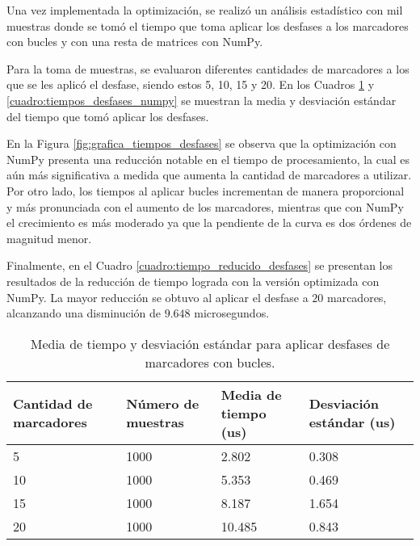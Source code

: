 Una vez implementada la optimización, se realizó un análisis estadístico con mil muestras donde se tomó el tiempo que toma aplicar los desfases a los marcadores con bucles y con una resta de matrices con NumPy.

Para la toma de muestras, se evaluaron diferentes cantidades de marcadores a los que se les aplicó el desfase, siendo estos 5, 10, 15 y 20. En los Cuadros \ref{cuadro:tiempos_desfases_for} y \ref{cuadro:tiempos_desfases_numpy} se muestran la media y desviación estándar del tiempo que tomó aplicar los desfases.

En la Figura \ref{fig:grafica_tiempos_desfases} se observa que la optimización con NumPy presenta una reducción notable en el tiempo de procesamiento, la cual es aún más significativa a medida que aumenta la cantidad de marcadores a utilizar. Por otro lado, los tiempos al aplicar bucles incrementan de manera proporcional y más pronunciada con el aumento de los marcadores, mientras que con NumPy el crecimiento es más moderado ya que la pendiente de la curva es dos órdenes de magnitud menor.

Finalmente, en el Cuadro \ref{cuadro:tiempo_reducido_desfases} se presentan los resultados de la reducción de tiempo lograda con la versión optimizada con NumPy. La mayor reducción se obtuvo al aplicar el desfase a $20$ marcadores, alcanzando una disminución de $9.648$ microsegundos.

\begin{table}[H]
	\centering
	\resizebox{\textwidth}{!} {
	\begin{tabular}{|l|l|l|l|}
		\hline
		\textbf{Cantidad de marcadores} & \textbf{Número de muestras} & \textbf{Media de tiempo (us)} & \textbf{Desviación estándar (us)} \\ \hline
		5                               & 1000                        & 2.802                         & 0.308                             \\ \hline
		10                              & 1000                        & 5.353                         & 0.469                             \\ \hline
		15                              & 1000                        & 8.187                         & 1.654                             \\ \hline
		20                              & 1000                        & 10.485                        & 0.843                             \\ \hline
	\end{tabular}}
	\caption{Media de tiempo y desviación estándar para aplicar desfases de marcadores con bucles.}
	\label{cuadro:tiempos_desfases_for}
\end{table}

